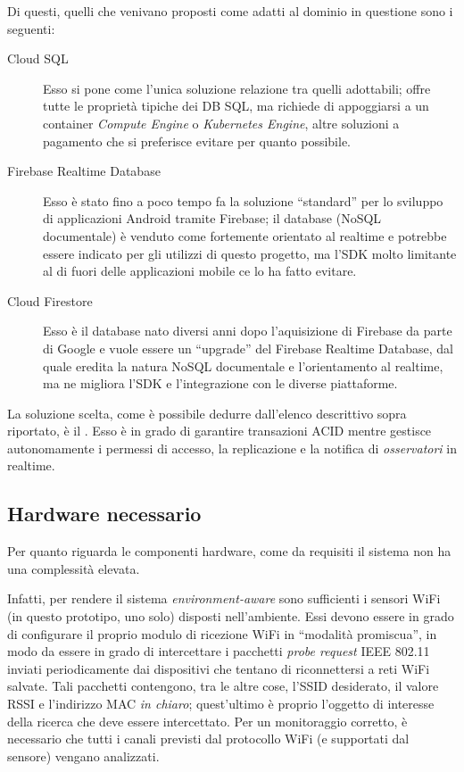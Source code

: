 Di questi, quelli che venivano proposti come adatti al dominio in questione sono i seguenti:

\begin{description}
  \item[Cloud SQL\footnotemark]
    Esso si pone come l'unica soluzione relazione tra quelli adottabili;
    offre tutte le proprietà tipiche dei DB SQL, ma richiede di appoggiarsi a un container \emph{Compute Engine} o \emph{Kubernetes Engine}, altre soluzioni a pagamento che si preferisce evitare per quanto possibile.
  \item[Firebase Realtime Database\footnotemark]
    Esso è stato fino a poco tempo fa la soluzione ``standard'' per lo sviluppo di applicazioni Android tramite Firebase;
    il database (NoSQL documentale) è venduto come fortemente orientato al realtime e potrebbe essere indicato per gli utilizzi di questo progetto, ma l'SDK molto limitante al di fuori delle applicazioni mobile ce lo ha fatto evitare.
  \item[Cloud Firestore\footnotemark]
    Esso è il database nato diversi anni dopo l'aquisizione di Firebase da parte di Google e vuole essere un ``upgrade'' del Firebase Realtime Database, dal quale eredita la natura NoSQL documentale e l'orientamento al realtime, ma ne migliora l'SDK e l'integrazione con le diverse piattaforme.
\end{description}

La soluzione scelta, come è possibile dedurre dall'elenco descrittivo sopra riportato, è il .
Esso è in grado di garantire transazioni ACID mentre gestisce autonomamente i permessi di accesso, la replicazione e la notifica di \emph{osservatori} in realtime.

\subsection{Hardware necessario}

Per quanto riguarda le componenti hardware, come da requisiti il sistema non ha una complessità elevata.

Infatti, per rendere il sistema \emph{environment-aware} sono sufficienti i sensori WiFi (in questo prototipo, uno solo) disposti nell'ambiente.
Essi devono essere in grado di configurare il proprio modulo di ricezione WiFi in ``modalità promiscua'',
in modo da essere in grado di intercettare i pacchetti \emph{probe request} IEEE 802.11 inviati periodicamente dai dispositivi che tentano di riconnettersi a reti WiFi salvate.
Tali pacchetti contengono, tra le altre cose, l'SSID desiderato, il valore RSSI e l'indirizzo MAC \emph{in chiaro};
quest'ultimo è proprio l'oggetto di interesse della ricerca che deve essere intercettato.
Per un monitoraggio corretto, è necessario che tutti i canali previsti dal protocollo WiFi (e supportati dal sensore) vengano analizzati.

